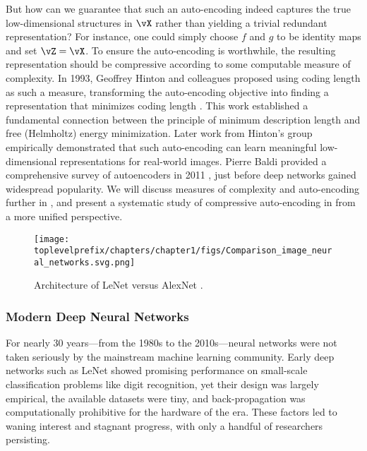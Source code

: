 \documentclass[../../book-main.tex]{subfiles}
\begin{document}
But how can we guarantee that such an auto-encoding indeed captures the true low-dimensional structures in \(\vX\) rather than yielding a trivial redundant representation? For instance, one could simply choose \(f\) and \(g\) to be identity maps and set \(\vZ = \vX\). To ensure the auto-encoding is worthwhile, the resulting representation should be compressive according to some computable measure of complexity. In 1993, Geoffrey Hinton and colleagues proposed using coding length as such a measure, transforming the auto-encoding objective into finding a representation that minimizes coding length \cite{Hinton-1993}. This work established a fundamental connection between the principle of minimum description length \cite{Rissanen-1978} and free (Helmholtz) energy minimization. Later work from Hinton's group \cite{Hinton504} empirically demonstrated that such auto-encoding can learn meaningful low-dimensional representations for real-world images. Pierre Baldi provided a comprehensive survey of autoencoders in 2011 \cite{Baldi2011}, just before deep networks gained widespread popularity. We will discuss measures of complexity and auto-encoding further in , and present a systematic study of compressive auto-encoding in  from a more unified perspective.

\begin{figure}
    \centering
    \texttt{[image: \\toplevelprefix/chapters/chapter1/figs/Comparison\_image\_neural\_networks.svg.png]}
    \caption{Architecture of LeNet \cite{LeCun-1989} versus AlexNet \cite{krizhevsky2012imagenet}.}
    \label{fig:LeNet-AlexNet}
\end{figure}


\subsubsection{Modern Deep Neural Networks}
For nearly 30 years---from the 1980s to the 2010s---neural networks were not taken seriously by the mainstream machine learning community. Early deep networks such as LeNet showed promising performance on small-scale classification problems like digit recognition, yet their design was largely empirical, the available datasets were tiny, and back-propagation was computationally prohibitive for the hardware of the era. These factors led to waning interest and stagnant progress, with only a handful of researchers persisting.
\end{document}
